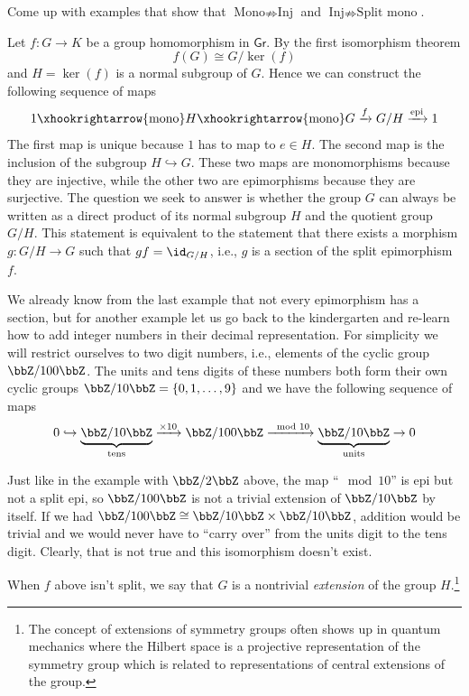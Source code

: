 \begin{xca}
    Come up with examples that show that $\text{Mono}\nRightarrow\text{Inj}$
    and $\text{Inj}\nRightarrow\text{Split mono}$.
\end{xca}
\begin{example}
    Let $f:G\rightarrow K$ be a group homomorphism in $\mathsf{Gr}$.
    By the first isomorphism theorem 
    \begin{equation}
        f(G)\cong G/\ker(f)
    \end{equation}
    and $H=\ker(f)$ is a normal subgroup of $G$. Hence we can construct
    the following sequence of maps
    \begin{equation}
        1\xhookrightarrow{\text{mono}}H\xhookrightarrow{\text{mono}}G\xrightarrow{f}G/H\xrightarrow{\text{epi}}1
    \end{equation}
    The first map is unique because $1$ has to map to $e\in H$. The second map is the inclusion of the subgroup $H\hookrightarrow G$. These two maps are monomorphisms because they are injective, while
    the other two are epimorphisms because they are surjective. The question
    we seek to answer is whether the group $G$ can always be written as
    a direct product of its normal subgroup $H$ and the quotient group $G/H$.
    This statement is equivalent to the statement that there exists a morphism
    $g:G/H\rightarrow G$ such that $gf=\id_{G/H}$, i.e., $g$ is a section
    of the split epimorphism $f$. 

    We already know from the last example that not every epimorphism has a section, but for another example let us go back to the kindergarten and
    re-learn how to add integer numbers in their decimal representation. For simplicity we will restrict ourselves
    to two digit numbers, i.e., elements of the cyclic group $\bbZ/100\bbZ$.
    The units and tens digits of these numbers both form their own cyclic
    groups $\bbZ/10\bbZ=\{0,1,\ldots,9\}$ and we have the following
    sequence of maps 
    \begin{equation}
    0\hookrightarrow\underbrace{\bbZ/10\bbZ}_\text{tens}\xrightarrow{\times10}\bbZ/100\bbZ\xrightarrow{\mod 10}\underbrace{\bbZ/10\bbZ}_\text{units}\rightarrow0
    \end{equation}

    Just like in the example with $\bbZ/2\bbZ$ above, the map ``$\mod 10$'' is epi but not a split epi, so $\bbZ/100\bbZ$ is not a trivial extension of $\bbZ/10\bbZ$ by itself. If we had $\bbZ/100\bbZ\cong\bbZ/10\bbZ\times\bbZ/10\bbZ$,
    addition would be trivial and we would never have to ``carry over''
    from the units digit to the tens digit. Clearly, that is not true
    and this isomorphism doesn't exist. 

    When $f$ above isn't split, we say that $G$ is a nontrivial \emph{extension}
    of the group $H$.\footnote{The concept of extensions of symmetry groups often shows up in quantum
    mechanics where the Hilbert space is a projective representation of
    the symmetry group which is related to representations of central
    extensions of the group.}
\end{example}




